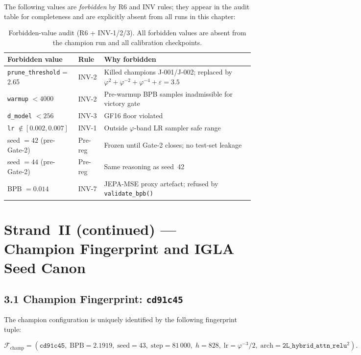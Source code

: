 The following values are \emph{forbidden} by R6 and INV rules; they
appear in the audit table for completeness and are explicitly absent
from all runs in this chapter:

\begin{table}[h]
\centering
\caption{Forbidden-value audit (R6 + INV-1/2/3). All forbidden values
  are absent from the champion run and all calibration checkpoints.}
\label{tab:forbidden-audit}
\begin{tabular}{lll}
\toprule
Forbidden value & Rule & Why forbidden\\
\midrule
\texttt{prune\_threshold} = 2.65 & INV-2 & Killed champions J-001/J-002; replaced by $\varphi^2+\varphi^{-2}+\varphi^{-4}+\varepsilon=3.5$\\
\texttt{warmup} $< 4000$ & INV-2 & Pre-warmup BPB samples inadmissible for victory gate\\
\texttt{d\_model} $< 256$ & INV-3 & GF16 floor violated\\
\texttt{lr} $\notin [0.002, 0.007]$ & INV-1 & Outside $\varphi$-band LR sampler safe range\\
seed $= 42$ (pre-Gate-2) & Pre-reg & Frozen until Gate-2 closes; no test-set leakage\\
seed $= 44$ (pre-Gate-2) & Pre-reg & Same reasoning as seed~42\\
BPB $= 0.014$ & INV-7 & JEPA-MSE proxy artefact; refused by \texttt{validate\_bpb()}\\
\bottomrule
\end{tabular}
\end{table}

\section{Strand~II (continued) — Champion Fingerprint and IGLA Seed Canon}
\label{sec:ch25-champion}

\subsection{3.1 Champion Fingerprint: \texttt{cd91c45}}
\label{subsec:ch25-champion-fingerprint}

The champion configuration is uniquely identified by the following
fingerprint tuple:

\begin{equation}
  \mathcal{F}_{\mathrm{champ}} = (\texttt{cd91c45},\;
  \mathrm{BPB}=2.1919,\;
  \mathrm{seed}=43,\;
  \mathrm{step}=81\,000,\;
  h=828,\;
  \mathrm{lr}=\varphi^{-3}/2,\;
  \mathrm{arch}=\texttt{2L\_hybrid\_attn\_relu}^2).
  \label{eq:champion-fingerprint}
\end{equation}

